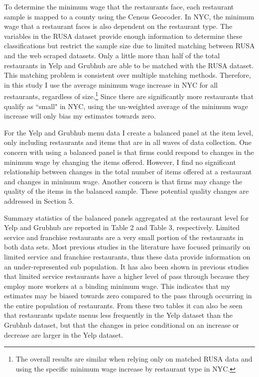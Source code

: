 \documentclass[11pt]{article}
\begin{document}
To determine the minimum wage that the restaurants face, each restaurant sample is mapped to a county using the Census Geocoder. In NYC, the minimum wage that a restaurant faces is also dependent on the restaurant type. The variables in the RUSA dataset provide enough information to determine these classifications but restrict the sample size due to limited matching between RUSA and the web scraped datasets. Only a little more than half of the total restaurants in Yelp and Grubhub are able to be matched with the RUSA dataset. This matching problem is consistent over multiple matching methods. Therefore, in this study I use the average minimum wage increase in NYC for all restaurants, regardless of size.\footnote{The overall results are similar when relying only on matched RUSA data and using the specific minimum wage increase by restaurant type in NYC.} Since there are significantly more restaurants that qualify as ``small" in NYC, using the un-weighted average of the minimum wage increase will only bias my estimates towards zero. 

For the Yelp and Grubhub menu data I create a balanced panel at the item level, only including restaurants and items that are in all waves of data collection. One concern with using a balanced panel is that firms could respond to changes in the minimum wage by changing the items offered. However, I find no significant relationship between changes in the total number of items offered at a restaurant and changes in minimum wage. Another concern is that firms may change the quality of the items in the balanced sample. These potential quality changes are addressed in Section 5. 

Summary statistics of the balanced panels aggregated at the restaurant level for Yelp and Grubhub are reported in Table 2 and Table 3, respectively. Limited service and franchise restaurants are a very small portion of the restaurants in both data sets. Most previous studies in the literature have focused primarily on limited service and franchise restaurants, thus these data provide information on an under-represented sub population. It has also been shown in previous studies that limited service restaurants have a higher level of pass through because they employ more workers at a binding minimum wage. This indicates that my estimates may be biased towards zero compared to the pass through occurring in the entire population of restaurants. From these two tables it can also be seen that restaurants update menus less frequently in the Yelp dataset than the Grubhub dataset, but that the changes in price conditional on an increase or decrease are larger in the Yelp dataset. 
\end{document}
